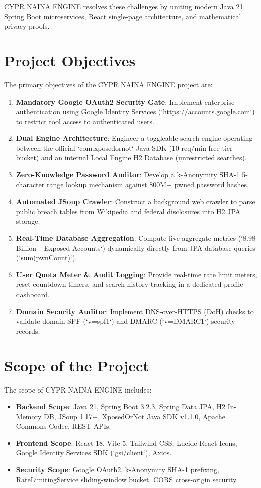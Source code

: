 \documentclass[12pt,a4paper,oneside]{report}
\begin{document}
CYPR NAINA ENGINE resolves these challenges by uniting modern Java 21 Spring Boot microservices, React single-page architecture, and mathematical privacy proofs.

\section{Project Objectives}

The primary objectives of the CYPR NAINA ENGINE project are:

\begin{enumerate}
    \item \textbf{Mandatory Google OAuth2 Security Gate}: Implement enterprise authentication using Google Identity Services (`https://accounts.google.com`) to restrict tool access to authenticated users.
    \item \textbf{Dual Engine Architecture}: Engineer a toggleable search engine operating between the official `com.xposedornot` Java SDK (10 req/min free-tier bucket) and an internal Local Engine H2 Database (unrestricted searches).
    \item \textbf{Zero-Knowledge Password Auditor}: Develop a k-Anonymity SHA-1 5-character range lookup mechanism against 800M+ pwned password hashes.
    \item \textbf{Automated JSoup Crawler}: Construct a background web crawler to parse public breach tables from Wikipedia and federal disclosures into H2 JPA storage.
    \item \textbf{Real-Time Database Aggregation}: Compute live aggregate metrics (`8.98 Billion+ Exposed Accounts`) dynamically directly from JPA database queries (`sum(pwnCount)`).
    \item \textbf{User Quota Meter & Audit Logging}: Provide real-time rate limit meters, reset countdown timers, and search history tracking in a dedicated profile dashboard.
    \item \textbf{Domain Security Auditor}: Implement DNS-over-HTTPS (DoH) checks to validate domain SPF (`v=spf1`) and DMARC (`v=DMARC1`) security records.
\end{enumerate}

\section{Scope of the Project}

The scope of CYPR NAINA ENGINE includes:

\begin{itemize}
    \item \textbf{Backend Scope}: Java 21, Spring Boot 3.2.3, Spring Data JPA, H2 In-Memory DB, JSoup 1.17+, XposedOrNot Java SDK v1.1.0, Apache Commons Codec, REST APIs.
    \item \textbf{Frontend Scope}: React 18, Vite 5, Tailwind CSS, Lucide React Icons, Google Identity Services SDK (`gsi/client`), Axios.
    \item \textbf{Security Scope}: Google OAuth2, k-Anonymity SHA-1 prefixing, RateLimitingService sliding-window bucket, CORS cross-origin security.
\end{itemize}
\end{document}
